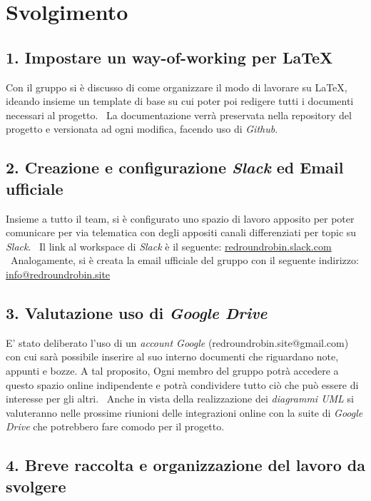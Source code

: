 \newpage
\section*{Svolgimento}

\subsection*{1. Impostare un way-of-working per \LaTeX{} }

Con il gruppo si è discusso di come organizzare il modo di lavorare su \LaTeX{}, ideando insieme un template di base su cui poter poi redigere tutti i documenti necessari al progetto. \
La documentazione verrà preservata nella repository del progetto e versionata ad ogni modifica, facendo uso di \textit{Github}.

\subsection*{2. Creazione e configurazione \textit{Slack} ed Email ufficiale}

Insieme a tutto il team, si è configurato uno spazio di lavoro apposito per poter comunicare per via telematica con degli appositi canali differenziati per topic su \textit{Slack}. \
Il link al workspace di \textit{Slack} è il seguente: \href{http://redroundrobin.slack.com}{redroundrobin.slack.com} \
Analogamente, si è creata la email ufficiale del gruppo con il seguente indirizzo:
\href{mailto:info@redroundrobin.site}{info@redroundrobin.site}


\subsection*{3. Valutazione uso di \textit{Google Drive}}

E' stato deliberato l'uso di un \textit{account Google} (redroundrobin.site@gmail.com) con cui sarà possibile inserire al suo interno documenti che riguardano note, appunti e bozze. A tal proposito, Ogni membro del gruppo potrà accedere a questo spazio online indipendente e potrà condividere tutto ciò che può essere di interesse per gli altri. \
Anche in vista della realizzazione dei \textit{diagrammi UML} si valuteranno nelle prossime riunioni delle integrazioni online con la suite di \textit{Google Drive} che potrebbero fare comodo per il progetto.


\subsection*{4. Breve raccolta e organizzazione del lavoro da svolgere}

